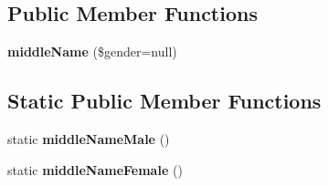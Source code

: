\subsection*{Public Member Functions}
\begin{DoxyCompactItemize}
\item 
\mbox{\label{classFaker_1_1Provider_1_1vi__VN_1_1Person_a33f7b77f00d3a4e5577fe46c90f09570}} 
{\bfseries middle\+Name} (\$gender=null)
\end{DoxyCompactItemize}
\subsection*{Static Public Member Functions}
\begin{DoxyCompactItemize}
\item 
\mbox{\label{classFaker_1_1Provider_1_1vi__VN_1_1Person_ad5964a9b2fa71f244c187830b06f9503}} 
static {\bfseries middle\+Name\+Male} ()
\item 
\mbox{\label{classFaker_1_1Provider_1_1vi__VN_1_1Person_abdd9185984d14569ac94d09bb6652544}} 
static {\bfseries middle\+Name\+Female} ()
\end{DoxyCompactItemize}
